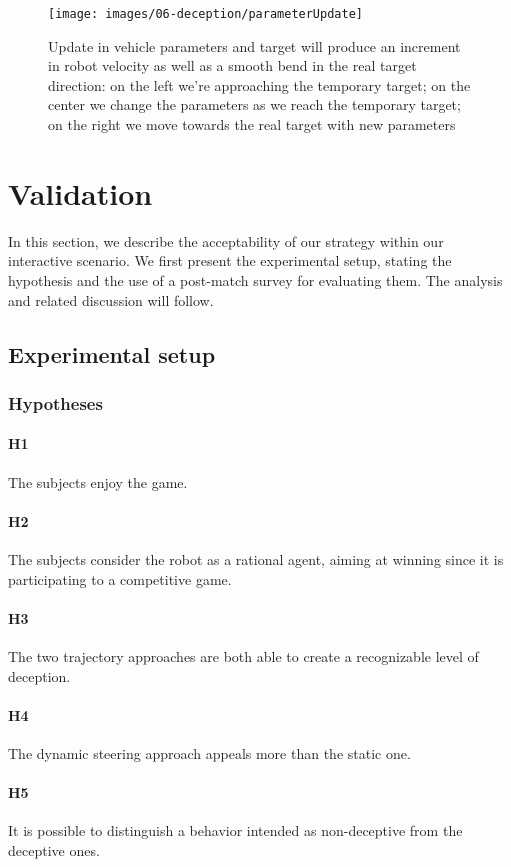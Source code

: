 \begin{figure}[htbp]
    \centering
    \texttt{[image: images/06-deception/parameterUpdate]}
    \caption{Update in vehicle parameters and target will produce an increment in robot velocity as well as a smooth bend in the real target direction: on the left we're approaching the temporary target; on the center we change the parameters as we reach the temporary target; on the right we move towards the real target with new parameters}
    \label{fig::trajectorySteering}
\end{figure}

\section{Validation}
\label{sec:deception_validation}
In this section, we describe the acceptability of our strategy within our interactive scenario. We first present the experimental setup, stating the hypothesis and the use of a post-match survey for evaluating them. The analysis and related discussion will follow. 

\subsection{Experimental setup}
\subsubsection{Hypotheses}

\paragraph{H1} The subjects enjoy the game.
\paragraph{H2} The subjects consider the robot as a rational agent, aiming at winning since it is participating to a competitive game.
\paragraph{H3} The two trajectory approaches are both able to create a recognizable level of deception. 
\paragraph{H4} The dynamic steering approach appeals more than the static one.
\paragraph{H5} It is possible to distinguish a behavior intended as non-deceptive from the deceptive ones.

